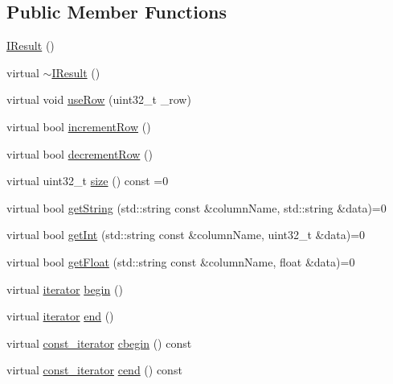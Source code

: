 \subsection*{Public Member Functions}
\begin{DoxyCompactItemize}
\item 
\hyperlink{classCore_1_1IResult_a4ef27140c899f8d161cdcd6b530ac379}{I\+Result} ()
\item 
virtual \hyperlink{classCore_1_1IResult_a73060de3740b154e3400fbbe9c5b984b}{$\sim$\+I\+Result} ()
\item 
virtual void \hyperlink{classCore_1_1IResult_ae0b4b5bca1f1ad8d4d7d887b656c67a7}{use\+Row} (uint32\+\_\+t \+\_\+row)
\item 
virtual bool \hyperlink{classCore_1_1IResult_a93fe49ee2a9ab7ed520293d9e1339a96}{increment\+Row} ()
\item 
virtual bool \hyperlink{classCore_1_1IResult_a3c210ff7fa555d104732198808356488}{decrement\+Row} ()
\item 
virtual uint32\+\_\+t \hyperlink{classCore_1_1IResult_a308ce2382287ba5de5102fc532097709}{size} () const =0
\item 
virtual bool \hyperlink{classCore_1_1IResult_a6b96b8324d81a1a65d60a4f6a6e78052}{get\+String} (std\+::string const \&column\+Name, std\+::string \&data)=0
\item 
virtual bool \hyperlink{classCore_1_1IResult_a9c01330c5b826ca948b48e13a330f4cd}{get\+Int} (std\+::string const \&column\+Name, uint32\+\_\+t \&data)=0
\item 
virtual bool \hyperlink{classCore_1_1IResult_a32e076c5c5ba522e4c58095637fe0f3e}{get\+Float} (std\+::string const \&column\+Name, float \&data)=0
\item 
virtual \hyperlink{classCore_1_1IResult_a1b8d24ea97ebbe669bb13c09ad5ad796}{iterator} \hyperlink{classCore_1_1IResult_a63b3ed4907f4735ed0bf044d3ab8dca8}{begin} ()
\item 
virtual \hyperlink{classCore_1_1IResult_a1b8d24ea97ebbe669bb13c09ad5ad796}{iterator} \hyperlink{classCore_1_1IResult_af2845d0ea33b90ea185af8904e336424}{end} ()
\item 
virtual \hyperlink{classCore_1_1IResult_a4f549868ef8d40c199565efd7b89f45c}{const\+\_\+iterator} \hyperlink{classCore_1_1IResult_a01a761f10597a834c9a26c0e58825973}{cbegin} () const 
\item 
virtual \hyperlink{classCore_1_1IResult_a4f549868ef8d40c199565efd7b89f45c}{const\+\_\+iterator} \hyperlink{classCore_1_1IResult_a73c390c4889a8ae7aaaf07e0dfd05fb4}{cend} () const 
\end{DoxyCompactItemize}
